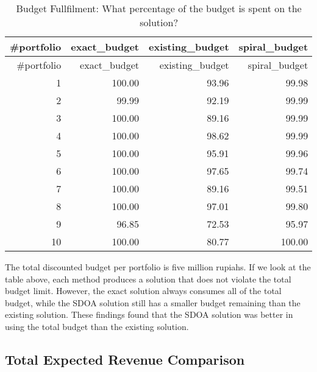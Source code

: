 \documentclass[
]{article}
\begin{document}
\begin{longtable}[]{@{}rrrr@{}}
\caption{Budget Fullfilment: What percentage of the budget is spent on
the solution?}\tabularnewline
\toprule()
\#portfolio & exact\_budget & existing\_budget & spiral\_budget \\
\midrule()
\endfirsthead
\toprule()
\#portfolio & exact\_budget & existing\_budget & spiral\_budget \\
\midrule()
\endhead
1 & 100.00 & 93.96 & 99.98 \\
2 & 99.99 & 92.19 & 99.99 \\
3 & 100.00 & 89.16 & 99.99 \\
4 & 100.00 & 98.62 & 99.99 \\
5 & 100.00 & 95.91 & 99.96 \\
6 & 100.00 & 97.65 & 99.74 \\
7 & 100.00 & 89.16 & 99.51 \\
8 & 100.00 & 97.01 & 99.80 \\
9 & 96.85 & 72.53 & 95.97 \\
10 & 100.00 & 80.77 & 100.00 \\
\bottomrule()
\end{longtable}

The total discounted budget per portfolio is five million rupiahs. If we
look at the table above, each method produces a solution that does not
violate the total budget limit. However, the exact solution always
consumes all of the total budget, while the SDOA solution still has a
smaller budget remaining than the existing solution. These findings
found that the SDOA solution was better in using the total budget than
the existing solution.

\hypertarget{total-expected-revenue-comparison}{%
\subsection{Total Expected Revenue
Comparison}\label{total-expected-revenue-comparison}}
\end{document}
